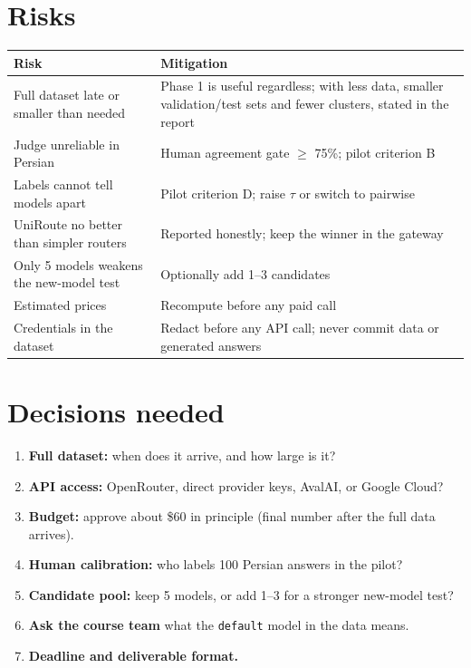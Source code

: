 \documentclass[11pt,a4paper]{article}
\begin{document}
\section{Risks}

\noindent\begin{tabularx}{\linewidth}{@{}P{62mm} L@{}}
\toprule
\textbf{Risk} & \textbf{Mitigation} \\
\midrule
Full dataset late or smaller than needed & Phase 1 is useful regardless; with less data, smaller validation/test sets and fewer clusters, stated in the report \\
Judge unreliable in Persian & Human agreement gate $\ge$ 75\%; pilot criterion B \\
Labels cannot tell models apart & Pilot criterion D; raise $\tau$ or switch to pairwise \\
UniRoute no better than simpler routers & Reported honestly; keep the winner in the gateway \\
Only 5 models weakens the new-model test & Optionally add 1--3 candidates \\
Estimated prices & Recompute before any paid call \\
Credentials in the dataset & Redact before any API call; never commit data or generated answers \\
\bottomrule
\end{tabularx}

\section{Decisions needed}

\begin{enumerate}
  \item \textbf{Full dataset:} when does it arrive, and how large is it?
  \item \textbf{API access:} OpenRouter, direct provider keys, AvalAI, or Google Cloud?
  \item \textbf{Budget:} approve about \$60 in principle (final number after the full data arrives).
  \item \textbf{Human calibration:} who labels 100 Persian answers in the pilot?
  \item \textbf{Candidate pool:} keep 5 models, or add 1--3 for a stronger new-model test?
  \item \textbf{Ask the course team} what the \texttt{default} model in the data means.
  \item \textbf{Deadline and deliverable format.}
\end{enumerate}
\end{document}
